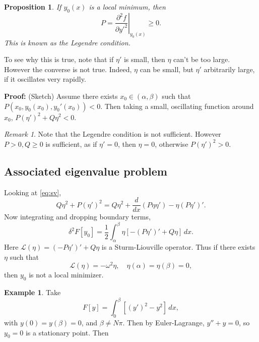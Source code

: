 \documentclass[12pt]{article}
\newtheorem{proposition}{Proposition}[section]
\theoremstyle{definition}
\newtheorem{example}{Example}[section]
\theoremstyle{remark}
\newtheorem*{remark}{Remark}
\begin{document}
\begin{proposition}
	If $y_0(x)$ is a local minimum, then
	\[
		P = \left. \frac{\partial^2 f}{\partial y'^2} \right|_{y_0(x)} \geq 0 \tag{8.2}\label{eq:lc}
		.\]
		This is known as the Legendre condition.
\end{proposition}

To see why this is true, note that if $\eta'$ is small, then $\eta$ can't be too large. However the converse is not true. Indeed, $\eta$ can be small, but $\eta'$ arbitrarily large, if it oscillates very rapidly.

\begin{adjustbox}{minipage = \columnwidth - 25.5pt, margin=1em, frame=1pt, margin=0em}
	\textbf{Proof:} (Sketch) Assume there exists $x_0 \in (\alpha, \beta)$ such that $P(x_0, y_0(x_0), y_0'(x_0)) < 0$. Then taking a small, oscillating function around $x_0$, $P(\eta')^2 + Q \eta^2 < 0$.
\end{adjustbox}

\begin{remark}
	Note that the Legendre condition is not sufficient. However $P > 0, Q \geq 0$ is sufficient, as if $\eta' = 0$, then $\eta = 0$, otherwise $P(\eta')^2 > 0$.
\end{remark}

\subsection{Associated eigenvalue problem}%
\label{sub:associated_eigenvalue_problem}

Looking at \eqref{eq:sv},
\[
	Q \eta^2 + P(\eta')^2 = Q \eta^2 + \frac{d}{dx} (P \eta \eta') - \eta(P \eta')'
.\] 
Now integrating and dropping boundary terms,
\[
	\delta^2 F[y_0] = \frac{1}{2} \int_{\alpha}^{\beta} \eta\left[ - (P \eta')' + Q \eta\right]\, dx
.\]
Here $\mathcal{L}(\eta) = (-P\eta')' + Q\eta$ is a Sturm-Liouville operator. Thus if there exists $\eta$ such that
\[
	\mathcal{L}(\eta) = - \omega^2 \eta, \quad \eta(\alpha) = \eta(\beta) = 0 \tag{8.2}\label{eq:aep}
,\]
then $y_0$ is not a local minimizer.

\begin{adjustbox}{minipage = \columnwidth - 25.5pt, margin=1em, frame=1pt, margin=0em}
\begin{example}
	Take
	\[
		F[y] = \int_{0}^{\beta} [(y')^2 - y^2]\, dx
	,\]
	with $y(0) = y(\beta) = 0$, and $\beta \neq N \pi$. Then by Euler-Lagrange, $y'' + y = 0$, so $y_0 = 0$ is a stationary point. Then
\end{example}

\end{adjustbox}
\end{document}
